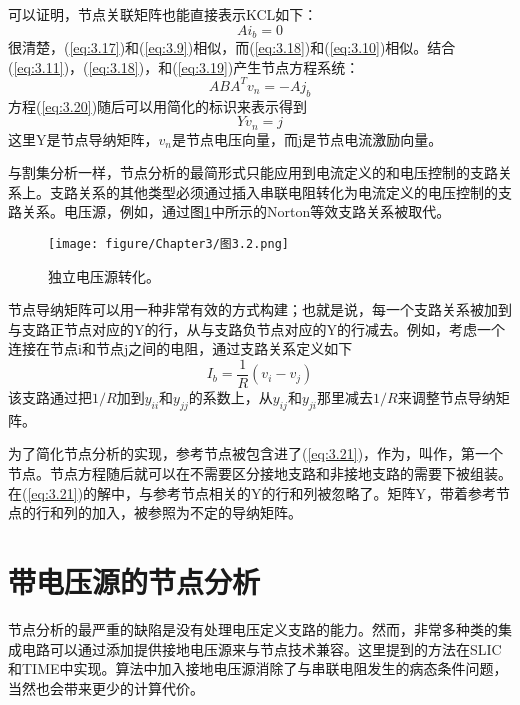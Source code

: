 可以证明\cite{ref-7}，节点关联矩阵也能直接表示KCL如下：
\begin{equation}
    Ai_b = 0
    \label{eq:3.19}
\end{equation}
很清楚，(\ref{eq:3.17})和(\ref{eq:3.9})相似，而(\ref{eq:3.18})和(\ref{eq:3.10})相似。结合(\ref{eq:3.11})，(\ref{eq:3.18})，和(\ref{eq:3.19})产生节点方程系统：
\begin{equation}
    ABA^Tv_n = -Aj_b
    \label{eq:3.20}
\end{equation}
方程(\ref{eq:3.20})随后可以用简化的标识来表示得到
\begin{equation}
    Yv_n = j
    \label{eq:3.21}
\end{equation}
这里Y是节点导纳矩阵，$v_n$是节点电压向量，而j是节点电流激励向量。

与割集分析一样，节点分析的最简形式只能应用到电流定义的和电压控制的支路关系上。支路关系的其他类型必须通过插入串联电阻转化为电流定义的电压控制的支路关系。电压源，例如，通过图\ref{图3.2}中所示的Norton等效支路关系被取代。
\begin{figure}[htbp]
\small
    \centering
    \texttt{[image: figure/Chapter3/图3.2.png]}
    \caption{独立电压源转化。}
    \label{图3.2}
\end{figure}
节点导纳矩阵可以用一种非常有效的方式构建；也就是说，每一个支路关系被加到与支路正节点对应的Y的行，从与支路负节点对应的Y的行减去。例如，考虑一个连接在节点i和节点j之间的电阻，通过支路关系定义如下
\begin{equation}
    I_b = \frac{1}{R}(v_i - v_j)
    \label{eq:3.22}
\end{equation}
该支路通过把$1/R$加到$y_{ii}$和$y_{jj}$的系数上，从$y_{ij}$和$y_{ji}$那里减去$1/R$来调整节点导纳矩阵。

为了简化节点分析的实现，参考节点被包含进了(\ref{eq:3.21})，作为，叫作，第一个节点。节点方程随后就可以在不需要区分接地支路和非接地支路的需要下被组装。在(\ref{eq:3.21})的解中，与参考节点相关的Y的行和列被忽略了。矩阵Y，带着参考节点的行和列的加入，被参照为不定的导纳矩阵\cite{ref-7}。

\section{带电压源的节点分析}
节点分析的最严重的缺陷是没有处理电压定义支路的能力。然而，非常多种类的集成电路可以通过添加提供接地电压源来与节点技术兼容。这里提到的方法在SLIC\cite{ref-14,ref-15}和TIME\cite{ref-19}中实现。算法中加入接地电压源消除了与串联电阻发生的病态条件问题，当然也会带来更少的计算代价。

